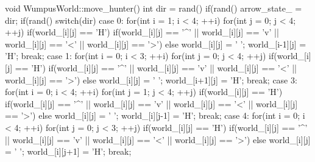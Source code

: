 \begin{answercode}
void WumpusWorld::move_hunter()
{
    int dir = rand() %
    if(rand() %
    {
        arrow_state_ = dir;
    }
    if(rand() %
    {
        switch(dir)
        {
            case 0:
                for(int i = 1; i < 4; ++i)
                {
                    for(int j = 0; j < 4; ++j)
                    {
                        if(world_[i][j] == 'H')
                        {
                            if(world_[i][j] == '^' ||
                               world_[i][j] == 'v' ||
                               world_[i][j] == '<' ||
                               world_[i][j] == '>')
                            {}
                            else
                            {
                                world_[i][j] = ' ';
                                world_[i-1][j] = 'H';
                            }
                        }
                    }
                }
                break;
            case 1:
                for(int i = 0; i < 3; ++i)
                {
                    for(int j = 0; j < 4; ++j)
                    {
                        if(world_[i][j] == 'H')
                        {
                            if(world_[i][j] == '^' ||
                               world_[i][j] == 'v' ||
                               world_[i][j] == '<' ||
                               world_[i][j] == '>')
                            {}
                            else
                            {
                                world_[i][j] = ' ';
                                world_[i+1][j] = 'H';
                            }
                        }
                    }
                }
                break;
            case 3:
                for(int i = 0; i < 4; ++i)
                {
                    for(int j = 1; j < 4; ++j)
                    {
                        if(world_[i][j] == 'H')
                        {
                            if(world_[i][j] == '^' ||
                               world_[i][j] == 'v' ||
                               world_[i][j] == '<' ||
                               world_[i][j] == '>')
                            {}
                            else
                            {
                                world_[i][j] = ' ';
                                world_[i][j-1] = 'H';
                            }
                        }
                    }
                }
                break;
            case 4:
                for(int i = 0; i < 4; ++i)
                {
                    for(int j = 0; j < 3; ++j)
                    {
                        if(world_[i][j] == 'H')
                        {
                            if(world_[i][j] == '^' ||
                               world_[i][j] == 'v' ||
                               world_[i][j] == '<' ||
                               world_[i][j] == '>')
                            {}
                            else
                            {
                                world_[i][j] = ' ';
                                world_[i][j+1] = 'H';
                            }
                        }
                    }
                }
                break;
        }
    }
}


\end{answercode}
